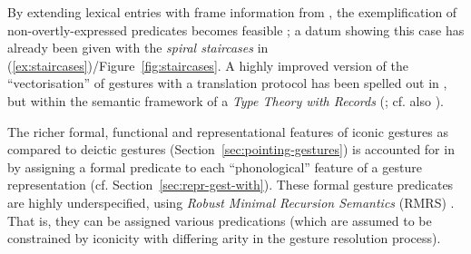 \documentclass[output=paper,biblatex,babelshorthands,newtxmath,draftmode,colorlinks,citecolor=brown]{langscibook}
\begin{document}
\ea \label{ex:half-circle}
\z

\largerpage
By extending lexical entries with frame information from  \citep{Fillmore82a-u}, the exemplification of non-overtly-expressed predicates becomes feasible \citep[Section~9.2.1]{Luecking:2013:a}; a datum showing this case has already been given with the \emph{spiral staircases} in (\ref{ex:staircases})/Figure~\ref{fig:staircases}.
%
A highly improved version of the \enquote{vectorisation} of gestures with a translation protocol has been spelled out in \citet{Luecking:2016}, but within the semantic framework of a \emph{Type Theory with Records} (\citealt{Cooper:ms,Cooper:Ginzburg:2015}; cf. also ).



The richer formal, functional and representational features of iconic gestures as compared to deictic gestures (Section~\ref{sec:pointing-gestures}) is accounted for in \citet{Alahverdzhieva:Lascarides:Flickinger:2017} by assigning a formal predicate to each \enquote{phonological} feature of a gesture representation (cf. Section~\ref{sec:repr-gest-with}). 
%
These formal gesture predicates are highly underspecified, using \textit{Robust Minimal Recursion Semantics} (RMRS) \citep{Copestake:2007}.
%
That is, they can be assigned various predications (which are assumed to be constrained by iconicity with differing arity in the gesture resolution process).
\end{document}
